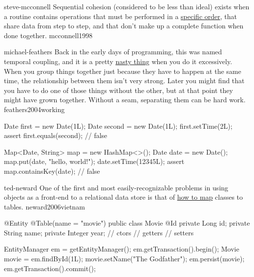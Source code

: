 \documentclass{article}
\begin{document}
\qte
  {steve-mcconnell}
  {Sequential cohesion (considered to be less than ideal) exists when a routine contains operations that must be performed in a \ul{specific order}, that share data from step to step, and that don't make up a complete function when done together.}
  {mcconnell1998}

\qte
  {michael-feathers}
  {Back in the early days of programming, this was named temporal coupling, and it is a pretty \ul{nasty thing} when you do it excessively. When you group things together just because they have to happen at the same time, the relationship between them isn’t very strong. Later you might find that you have to do one of those things without the other, but at that point they might have grown together. Without a seam, separating them can be hard work.}
  {feathers2004working}

\begin{pptWide}{2}
{\small\begin{ffcode}
Date first = new Date(1L);
Date second = new Date(1L);
first.setTime(2L);
assert first.equals(second); // false
\end{ffcode}
}
\par\columnbreak\par
{\small\begin{ffcode}
Map<Date, String> map = new HashMap<>();
Date date = new Date();
map.put(date, "hello, world!");
date.setTime(12345L);
assert map.containsKey(date); // false
\end{ffcode}
}
\end{pptWide}
\par
\plush{}



\qte
  {ted-neward}
  {One of the first and most easily-recognizable problems in using objects as a front-end to a relational data store is that of \ul{how to map} classes to tables.}
  {neward2006vietnam}

\begin{pptWide}{2}
{\small\begin{ffcode}
@Entity
@Table(name = "movie")
public class Movie {
  @Id
  private Long id;
  private String name;
  private Integer year;
  // ctors
  // getters
  // setters
}
\end{ffcode}
}
\par\columnbreak\par
{\small\begin{ffcode}
EntityManager em = getEntityManager();
em.getTransaction().begin();
Movie movie = em.findById(1L);
movie.setName("The Godfather");
em.persist(movie);
em.getTransaction().commit();
\end{ffcode}
}
\end{pptWide}
\par
\plush{}
\end{document}
